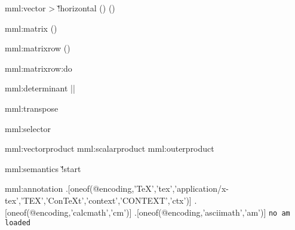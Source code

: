 
\setupMMLappearance [vector] [\c!direction=\v!horizontal,\c!separator={,}]

\startxmlsetups mml:vector
    \begingroup
    \ifnum{}>\plusone
        \doifelse\MMLvectordirection\v!horizontal {
            \left(\right)
        } {
            \MMLcreset\left(\right)
        }
    \else
    \fi
    \endgroup
\stopxmlsetups

\settrue\MMCdelmatrix %

\startxmlsetups mml:matrix
    \begingroup
    \MMLcreset
    \ifconditional\MMCdelmatrix
        \left(\right)
    \else
        \settrue\MMCdelmatrix
    \fi
    \endgroup
\stopxmlsetups

\startxmlsetups mml:matrixrow
    \begingroup
    \MMLcreset
    \left(\right)
    \endgroup
\stopxmlsetups

\startxmlsetups mml:matrixrow:do
    \crcr
\stopxmlsetups

\startxmlsetups mml:determinant
    \begingroup
    \setfalse\MMCdelmatrix
    \left|\right|
    \endgroup
\stopxmlsetups

\startxmlsetups mml:transpose
\stopxmlsetups

\startxmlsetups mml:selector
\stopxmlsetups

\startxmlsetups mml:vectorproduct \times {} \stopxmlsetups
\startxmlsetups mml:scalarproduct \cdot  {} \stopxmlsetups
\startxmlsetups mml:outerproduct  \otimes{} \stopxmlsetups


\setupMMLappearance[semantics][\c!state=\v!start]

\startxmlsetups mml:semantics
    \doifelse\MMLsemanticsstate\v!start {
    } {
    }
\stopxmlsetups

\startxmlsetups mml:annotation
     {.[oneof(@encoding,'TeX','tex','application/x-tex','TEX','ConTeXt','context','CONTEXT','ctx')]} {
    } {
         {.[oneof(@encoding,'calcmath','cm')]} {
        } {
             {.[oneof(@encoding,'asciimath','am')]} {
                \ifdefined\asciimath
                \else
                    \hbox{\tt no am loaded}
                \fi
            } {
            }
        }
    }
\stopxmlsetups


